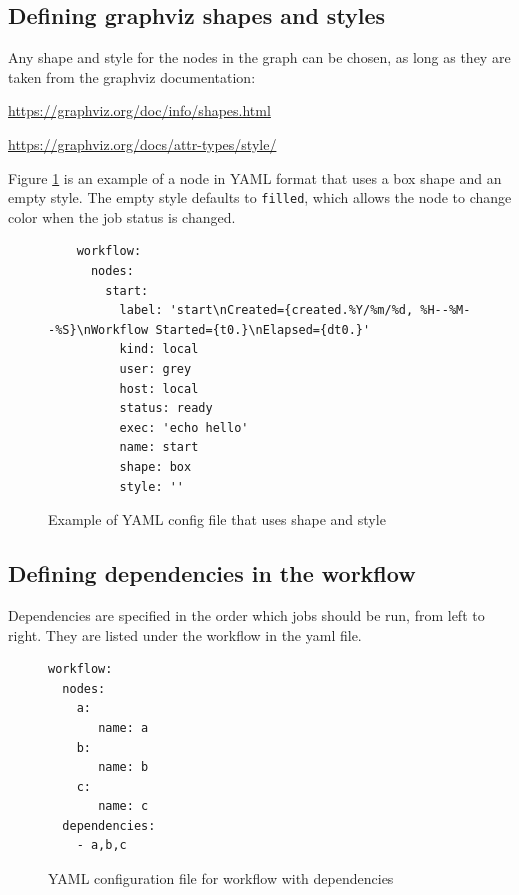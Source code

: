 \subsection{Defining graphviz shapes and
styles}\label{defining-graphviz-shapes-and-styles}

Any shape and style for the nodes in the graph can be chosen, as long as
they are taken from the graphviz documentation:

\url{https://graphviz.org/doc/info/shapes.html}

\url{https://graphviz.org/docs/attr-types/style/}

Figure \ref{fig:shape-style-yaml} is an example of a node in YAML format that uses a box shape and an empty style. The empty style defaults to \texttt{filled}, which allows the node to change color when the job status is changed.

\begin{figure}
    \begin{verbatim}
    workflow:
      nodes:
        start:
          label: 'start\nCreated={created.%Y/%m/%d, %H--%M--%S}\nWorkflow Started={t0.}\nElapsed={dt0.}'
          kind: local
          user: grey
          host: local
          status: ready
          exec: 'echo hello'
          name: start
          shape: box
          style: ''
    \end{verbatim}
    \caption{Example of YAML config file that uses shape and style}
    \label{fig:shape-style-yaml}
\end{figure}

\subsection{Defining dependencies in the
workflow}\label{defining-dependencies-in-the-workflow}

Dependencies are specified in the order which jobs should be run, from
left to right. They are listed under the workflow in the yaml file.

\begin{figure}
\begin{verbatim}
workflow:
  nodes:
    a:
       name: a
    b:
       name: b
    c:
       name: c
  dependencies:
    - a,b,c
\end{verbatim}
    \centering
    \caption{YAML configuration file for workflow with dependencies}
    \label{fig:dependency-workflow}
\end{figure}

